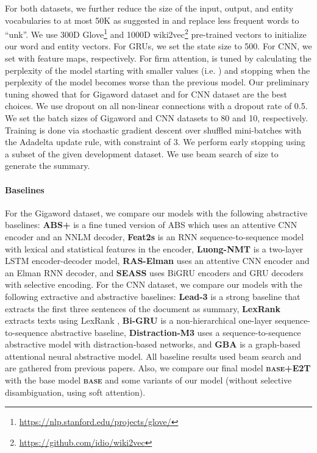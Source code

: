 \documentclass[11pt,a4paper]{article}
\begin{document}
For both datasets, we further reduce the size of the input, output, and entity vocabularies to at most 50K as suggested in \cite{see2017get} and replace less frequent words to ``unk''. We use 300D Glove\footnote{\url{https://nlp.stanford.edu/projects/glove/}} \cite{pennington2014glove} and 1000D wiki2vec\footnote{\url{https://github.com/idio/wiki2vec}} pre-trained vectors to initialize our word and entity vectors. For GRUs, we set the state size to 500. For CNN, we set  with  feature maps, respectively. For firm attention,  is tuned
by calculating the perplexity of the model starting with smaller values (i.e. ) and stopping when the perplexity of the model becomes worse than the previous model.
Our preliminary tuning showed that  for Gigaword dataset and  for CNN dataset are the best choices.
We use dropout \cite{srivastava2014dropout} on all non-linear connections with a dropout rate of 0.5. 
We set the batch sizes of Gigaword and CNN datasets to 80 and 10, respectively.
Training is done via stochastic gradient descent over shuffled mini-batches with the Adadelta update rule, with  constraint \cite{hinton2012improving} of 3. We perform early stopping using a subset of the given development dataset. We use beam search of size  to generate the summary.

\paragraph{Baselines}

For the Gigaword dataset, we compare our models with the following abstractive baselines: \textbf{ABS+} \cite{rush2015neural} is a fine tuned version of ABS which uses an attentive CNN encoder and an NNLM decoder, \textbf{Feat2s} \cite{nallapati2016abstractive} is an RNN sequence-to-sequence model with lexical and statistical features in the encoder, \textbf{Luong-NMT} \cite{luong2015effective} is a two-layer LSTM encoder-decoder model, \textbf{RAS-Elman} \cite{chopra2016abstractive} uses an attentive CNN encoder and an Elman RNN decoder, and \textbf{SEASS} \cite{zhou2017selective} uses BiGRU encoders and GRU decoders with selective encoding.
For the CNN dataset, we compare our models with the following extractive and abstractive baselines:
\textbf{Lead-3} is a strong baseline that extracts the first three sentences of the document as summary, \textbf{LexRank} extracts texts using LexRank \cite{erkan2004lexrank}, \textbf{Bi-GRU} is a non-hierarchical one-layer sequence-to-sequence abstractive baseline, \textbf{Distraction-M3} \cite{chen2016distraction} uses a sequence-to-sequence abstractive model with distraction-based networks, and \textbf{GBA} \cite{tan2017abstractive} is a graph-based attentional neural abstractive model.
All baseline results used beam search and are gathered from previous papers. Also, we compare our final model \textbf{\textsc{base}+E2T} with the base model \textbf{\textsc{base}} and some variants of our model (without selective disambiguation, using soft attention).
\end{document}
